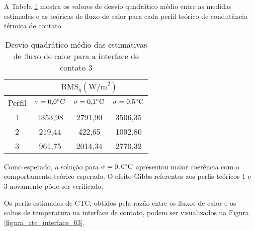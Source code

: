 A Tabela \ref{tabela_rms_fluxo_calor_interface_3} mostra os valores de desvio quadrático médio entre as medidas estimadas e as teóricas de fluxo de calor para cada perfil teórico de condutância térmica de contato.
\begin{table}[H]
	\centering
	\caption{Desvio quadrático médio das estimativas de fluxo de calor para a interface de contato 3}
	\begin{tabular}{c|c|c|c|}
		\cline{2-4}
		& \multicolumn{3}{c|}{$\text{RMS}_{q}(\text{W/m}^2)$} \\ \hline
		\multicolumn{1}{|c|}{Perfil} & $\sigma = \text{0,0}\celsius$   & $\sigma = \text{0,1}\celsius$    & $\sigma = \text{0,5}\celsius$  \\ \hline
		\multicolumn{1}{|c|}{1}      & 1353,98       & 2791,90       & 3506,35     \\ \hline
		\multicolumn{1}{|c|}{2}      & 219,44       & 422,65       & 1092,80      \\ \hline
		\multicolumn{1}{|c|}{3}      & 961,75       & 2014,34       & 2770,32      \\ \hline
	\end{tabular}
	\label{tabela_rms_fluxo_calor_interface_3}
\end{table}

Como esperado, a solução para $\sigma = 0,0\celsius$ apresentou maior coerência com o comportamento teórico esperado. O efeito Gibbs referentes aos perfis teóricos 1 e 3 novamente pôde ser verificado.

%
%

Os perfis estimados de CTC, obtidos pela razão entre os fluxos de calor e os saltos de temperatura na interface de contato, podem ser visualizados na Figura \ref{figura_ctc_interface_03}.

